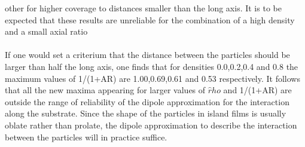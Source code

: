 \begin{itemize}
other for higher coverage to distances smaller than the long axis. It is to be expected that these results
are unreliable for the combination of a high density and a small axial ratio\\
\\
If one would set a criterium that the distance between the particles should be larger than half the 
long axis, one finds that for densities 0.0,0.2,0.4 and 0.8 the maximum values of 1/(1+AR) are
1.00,0.69,0.61 and 0.53 respectively. It follows that all the new maxima appearing for larger values of 
$\hat rho$ and 1/(1+AR) are outside the range of reliability of the dipole approximation for the 
interaction along the substrate. Since the shape of the particles in island films is usually oblate
rather than prolate, the dipole approximation to describe the interaction between the particles 
will in practice suffice.

\end{itemize}
